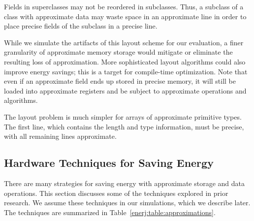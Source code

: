 Fields in superclasses may not be reordered in subclasses.
Thus, a subclass of a class with approximate data may waste space in
an approximate line in order to place precise fields of the subclass
in a precise line.

While we simulate the artifacts of this layout scheme for our evaluation,
a finer granularity of approximate memory storage would mitigate or
eliminate the resulting loss of approximation.
More sophisticated layout algorithms could also improve energy savings;
this is a target for compile-time optimization.
Note that
even if an approximate field ends up stored in precise memory, it will
still be loaded into approximate registers and be subject to
approximate operations and algorithms.

The layout problem is much simpler for arrays of approximate primitive
types. The first line, which
contains the length and type information, must be precise, with all remaining
lines approximate.


\subsection{Hardware Techniques for Saving Energy }
\label{enerj:strategies}





There are many strategies for saving energy with approximate
storage and data operations. This section discusses some of the
techniques explored in prior research. We assume these techniques in
our simulations, which we describe later. The techniques are summarized
in Table~\ref{enerj:table:approximations}.


